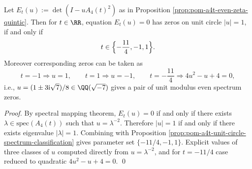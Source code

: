 \begin{corollary}\label{cor:pom-a4t-even-spectrum-unit-circle-touchpoints}
Let \(E_t(u):=\det(I-uA_4(t)^2)\) as in Proposition \ref{prop:pom-a4t-even-zeta-quintic}.
Then for \(t\in\RR\), equation \(E_t(u)=0\) has zeros on unit circle \(|u|=1\), if and only if
\[
t\in\Bigl\{-\frac{11}{4},-1,1\Bigr\}.
\]
Moreover corresponding zeros can be taken as
\[
t=-1\Rightarrow u=1,
\qquad
t=1\Rightarrow u=-1,
\qquad
t=-\frac{11}{4}\Rightarrow 4u^{2}-u+4=0,
\]
i.e., \(u=(1\pm 3\mathrm{i}\sqrt7)/8\in\QQ(\sqrt{-7})\) gives a pair of unit modulus even spectrum zeros.
\end{corollary}
\begin{proof}
By spectral mapping theorem,
\(
E_t(u)=0
\)
if and only if there exists \(\lambda\in\mathrm{spec}(A_4(t))\) such that \(u=\lambda^{-2}\).
Therefore \(|u|=1\) if and only if there exists eigenvalue \(|\lambda|=1\).
Combining with Proposition \ref{prop:pom-a4t-unit-circle-spectrum-classification} gives parameter set \(\{-11/4,-1,1\}\).
Explicit values of three classes of \(u\) computed directly from \(u=\lambda^{-2}\), and for \(t=-11/4\) case reduced to quadratic \(4u^2-u+4=0\). \qed
\end{proof}

